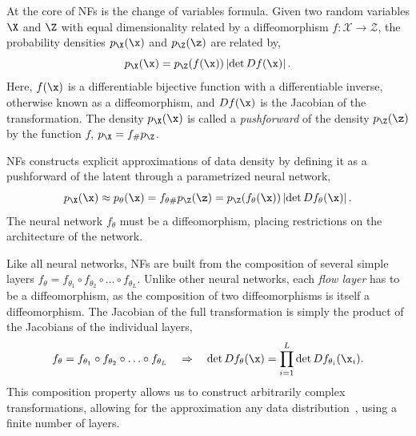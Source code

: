 At the core of NFs is the change of variables formula.
Given two random variables $\X$ and $\Z$ with equal dimensionality related by a diffeomorphism $f: \mathcal{X} \rightarrow \mathcal{Z}$, the probability densities $p_\X(\x)$ and $p_\Z(\z)$ are related by,
\begin{equation}
    \label{eq:change_of_variables}
    p_\X(\x) = p_\Z(f(\x)) \left|\det D f(\x) \right|.
\end{equation}
Here, $f(\x)$ is a differentiable bijective function with a differentiable inverse, otherwise known as a diffeomorphism, and $D f(\x)$ is the Jacobian of the transformation.
The density $p_\X(\x)$ is called a \textit{pushforward} of the density $p_\Z(\z)$ by the function $f$, $p_\X = f_\# p_\Z$.

NFs constructs explicit approximations of data density by defining it as a pushforward of the latent through a parametrized neural network,
\begin{equation}
    p_{\X}(\x) \approx p_{\theta}(\x) = f_{\theta \#} p_\Z(\z) = p_\Z(f_{\theta}(\x)) \left|\det D f_{\theta}(\x) \right|.
\end{equation}
The neural network $f_{\theta}$ must be a diffeomorphism, placing restrictions on the architecture of the network.

Like all neural networks, NFs are built from the composition of several simple layers $f_\theta = f_{\theta_1} \circ f_{\theta_2} \circ \ldots \circ f_{\theta_L}$.
Unlike other neural networks, each \textit{flow layer} has to be a diffeomorphism, as the composition of two diffeomorphisms is itself a diffeomorphism.
The Jacobian of the full transformation is simply the product of the Jacobians of the individual layers,
\begin{equation}
    f_\theta = f_{\theta_1} \circ f_{\theta_2} \circ \ldots \circ f_{\theta_L} \quad \Rightarrow \quad \det D f_\theta(\x) = \prod_{i=1}^L \det D f_{\theta_i}(\x_i).
\end{equation}
This composition property allows us to construct arbitrarily complex transformations, allowing for the approximation any data distribution~\cite{bogachev2005triangular}, using a finite number of layers.

